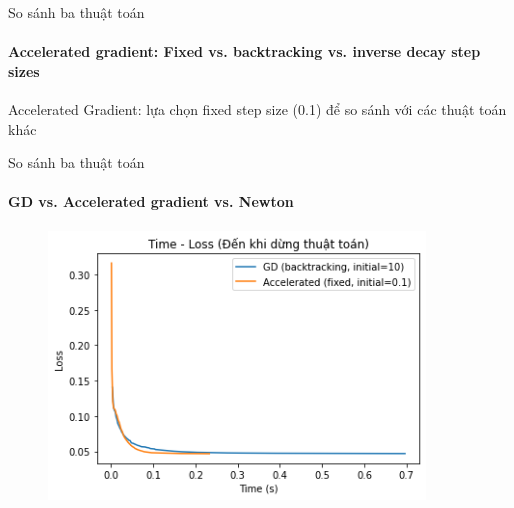 \documentclass[10pt]{beamer}
\theoremstyle{remark}
\theoremstyle{definition}
\begin{document}
\begin{frame}{So sánh ba thuật toán}
	\framesubtitle{Accelerated gradient: Fixed vs. backtracking vs. inverse decay step sizes }
	
\begin{table}[]
	\centering
	\end{table}

	Accelerated Gradient: lựa chọn fixed step size (0.1) để so sánh với các thuật toán khác
\end{frame}

\begin{frame}{So sánh ba thuật toán}
	\framesubtitle{GD vs. Accelerated gradient vs. Newton}
	\begin{figure}[h!]
		\centering
		\includegraphics[width=10cm]{Thinh/24.png}
	\end{figure}
\end{frame}
\end{document}
